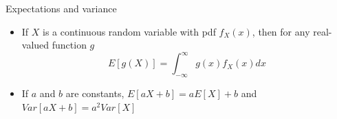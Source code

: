 \documentclass{beamer}
\begin{document}
\begin{frame}{Expectations and variance}

	\begin{itemize}
		\item If $X$ is a continuous random variable with pdf $f_X(x)$, then for 
			any real-valued function $g$
			\begin{equation*}
				E[g(X)] = \int_{-\infty}^{\infty} g(x) f_X(x) dx
			\end{equation*}
		\item If $a$ and $b$ are constants, $E[aX+b]=aE[X]+b$ and $Var[aX+b]=a^2Var[X]$
	\end{itemize}

\end{frame}
\end{document}
